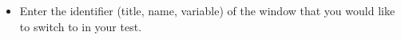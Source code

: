 
\begin{itemize}
\item Enter the identifier (title, name, variable)  of the window that you would like to switch to in your test.
\end{itemize}
